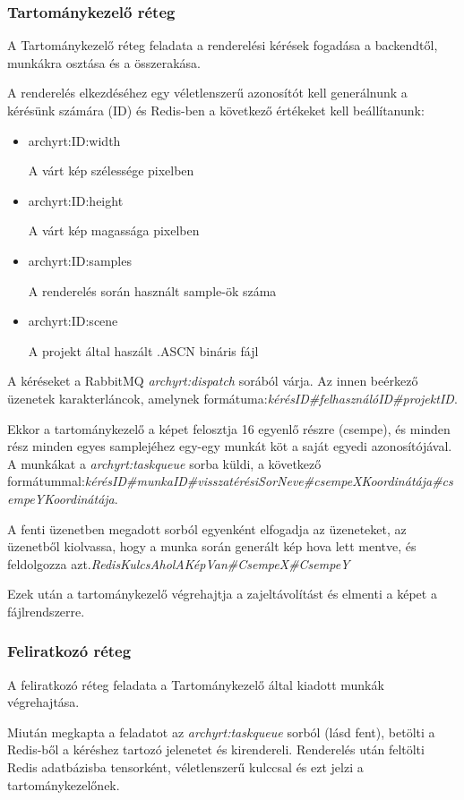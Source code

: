 \subsubsection{Tartománykezelő réteg}
A Tartománykezelő réteg feladata a renderelési kérések fogadása a backendtől, munkákra osztása és a összerakása.

A renderelés elkezdéséhez egy véletlenszerű azonosítót kell generálnunk a kérésünk számára (ID) és Redis-ben a következő értékeket kell beállítanunk:

\begin{itemize}
    \item archyrt:ID:width
    
    A várt kép szélessége pixelben
    \item archyrt:ID:height
    
    A várt kép magassága pixelben
    \item archyrt:ID:samples
    
    A renderelés során használt sample-ök száma
    \item archyrt:ID:scene
    
    A projekt által haszált .ASCN bináris fájl
\end{itemize}

A kéréseket a RabbitMQ \emph{archyrt:dispatch} sorából várja. Az innen beérkező üzenetek karakterláncok, amelynek formátuma:\emph{kérésID\#felhasználóID\#projektID}.

Ekkor a tartománykezelő a képet felosztja 16 egyenlő részre (csempe), és minden rész minden egyes samplejéhez egy-egy munkát köt a saját egyedi azonosítójával. A munkákat a \emph{archyrt:taskqueue} sorba küldi, a következő formátummal:\linebreak\emph{kérésID\#munkaID\#visszatérésiSorNeve\#csempeXKoordinátája\#csempeYKoordinátája}.

A fenti üzenetben megadott sorból egyenként elfogadja az üzeneteket, az üzenetből kiolvassa, hogy a munka során generált kép hova lett mentve, és feldolgozza azt.\linebreak \emph{RedisKulcsAholAKépVan\#CsempeX\#CsempeY}

Ezek után a tartománykezelő végrehajtja a zajeltávolítást és elmenti a képet a fájlrendszerre.

\subsubsection{Feliratkozó réteg}
A feliratkozó réteg feladata a Tartománykezelő által kiadott munkák végrehajtása. 

Miután megkapta a feladatot az \emph{archyrt:taskqueue} sorból (lásd fent), betölti a Redis-ből a kéréshez tartozó jelenetet és kirendereli. Renderelés után feltölti Redis adatbázisba tensorként, véletlenszerű kulccsal és ezt jelzi a tartománykezelőnek.